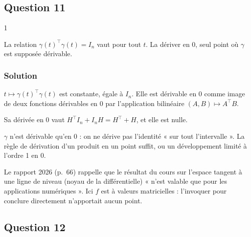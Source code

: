 \documentclass[11pt,a4paper]{article}
\newcommand{\equationajustee}[1]{%
  \sbox{\boiteequation}{$\displaystyle #1$}%
  \ifdim\wd\boiteequation>\linewidth
    \[\resizebox{\linewidth}{!}{\usebox{\boiteequation}}\]%
  \else
    \[#1\]%
  \fi}
\begin{document}
\hypertarget{question-11}{%
\subsection{Question 11}\label{question-11}}

\begin{indication}{1}

La relation \(\gamma(t)^\top\gamma(t)=I_n\) vaut pour tout \(t\). La dériver en \(0\), seul point où \(\gamma\) est supposée dérivable.

\end{indication}

\hypertarget{solution-10}{%
\subsubsection{Solution}\label{solution-10}}

\(t\mapsto\gamma(t)^\top\gamma(t)\) est constante, égale à \(I_n\). Elle est dérivable en \(0\) comme image de deux fonctions dérivables en \(0\) par l'application bilinéaire \((A,B)\mapsto A^\top B\).

Sa dérivée en \(0\) vaut \(H^\top I_n+I_nH=H^\top+H\), et elle est nulle.

\equationajustee{\boxed{T\subset\mathcal A_n(\mathbb R)}}

\begin{piege}

\(\gamma\) n'est dérivable qu'en \(0\) : on ne dérive pas l'identité « sur tout l'intervalle ». La règle de dérivation d'un produit en un point suffit, ou un développement limité à l'ordre 1 en \(0\).

\end{piege}

\begin{jury}

Le rapport 2026 (p.~66) rappelle que le résultat du cours sur l'espace tangent à une ligne de niveau (noyau de la différentielle) « n'est valable que pour les applications numériques ». Ici \(f\) est à valeurs matricielles : l'invoquer pour conclure directement n'apportait aucun point.

\end{jury}

\hypertarget{question-12}{%
\subsection{Question 12}\label{question-12}}
\end{document}
